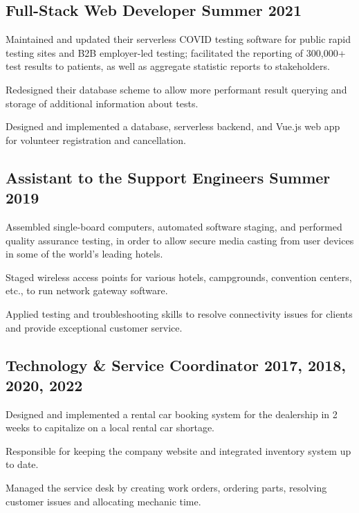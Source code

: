\documentclass[letter,10pt]{article}
\begin{document}
\subsection{{Full-Stack Web Developer \hfill Summer 2021}}
\begin{zitemize}
\item Maintained and updated their serverless COVID testing software for public rapid testing sites and B2B employer-led testing; facilitated the reporting of 300,000+ test results to patients, as well as aggregate statistic reports to stakeholders.
\item Redesigned their database scheme to allow more performant result querying and storage of additional information about tests.
\item Designed and implemented a database, serverless backend, and Vue.js web app for volunteer registration and cancellation.
\end{zitemize}

\subsection{{Assistant to the Support Engineers \hfill Summer 2019}}
\begin{zitemize}
\item Assembled single-board computers, automated software staging, and performed quality assurance testing, in order to allow secure media casting from user devices in some of the world's leading hotels.
\item Staged wireless access points for various hotels, campgrounds, convention centers, etc., to run network gateway software.
\item Applied testing and troubleshooting skills to resolve connectivity issues for clients and provide exceptional customer service.
\end{zitemize}

\subsection{{Technology \& Service Coordinator  \hfill 2017, 2018, 2020, 2022}}
\begin{zitemize}
\item Designed and implemented a rental car booking system for the dealership in 2 weeks to capitalize on a local rental car shortage.
\item Responsible for keeping the company website and integrated inventory system up to date.
\item Managed the service desk by creating work orders, ordering parts, resolving customer issues and allocating mechanic time.
\end{zitemize}
\end{document}
